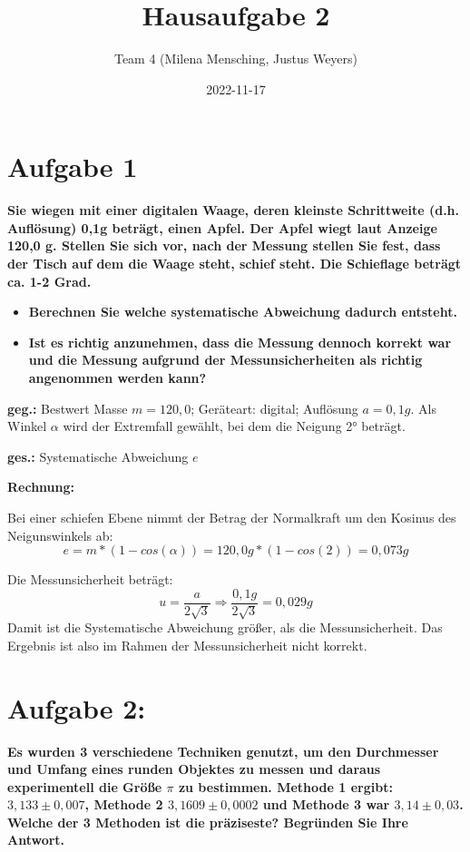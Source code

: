 \documentclass[
]{article}
\title{Hausaufgabe 2}
\author{Team 4 (Milena Mensching, Justus Weyers)}
\date{2022-11-17}
\providecommand{\tightlist}{%
  \setlength{\itemsep}{0pt}\setlength{\parskip}{0pt}}
\begin{document}
\maketitle

\hypertarget{aufgabe-1}{%
\section{Aufgabe 1}\label{aufgabe-1}}

\textbf{Sie wiegen mit einer digitalen Waage, deren kleinste
Schrittweite (d.h. Auflösung) 0,1g beträgt, einen Apfel. Der Apfel wiegt
laut Anzeige 120,0 g. Stellen Sie sich vor, nach der Messung stellen Sie
fest, dass der Tisch auf dem die Waage steht, schief steht. Die
Schieflage beträgt ca. 1-2 Grad.}

\begin{itemize}
\tightlist
\item
  \textbf{Berechnen Sie welche systematische Abweichung dadurch
  entsteht.}
\item
  \textbf{Ist es richtig anzunehmen, dass die Messung dennoch korrekt
  war und die Messung aufgrund der Messunsicherheiten als richtig
  angenommen werden kann?}
\end{itemize}

\textbf{geg.:} Bestwert Masse \(m = 120,0\); Geräteart: digital;
Auflösung \(a=0,1g\). Als Winkel \(\alpha\) wird der Extremfall gewählt,
bei dem die Neigung 2° beträgt.

\textbf{ges.:} Systematische Abweichung \(e\)

\textbf{Rechnung:}

Bei einer schiefen Ebene nimmt der Betrag der Normalkraft um den Kosinus
des Neigunswinkels ab:
\[e = m*(1-cos(\alpha)) = 120,0g*(1-cos(2)) = 0,073g\]

Die Messunsicherheit beträgt:
\[ u = \frac{a}{2\sqrt{3}} \Rightarrow \frac{0,1g}{2\sqrt{3}} = 0,029g\]
Damit ist die Systematische Abweichung größer, als die Messunsicherheit.
Das Ergebnis ist also im Rahmen der Messunsicherheit nicht korrekt.

\hypertarget{aufgabe-2}{%
\section{Aufgabe 2:}\label{aufgabe-2}}

\textbf{Es wurden 3 verschiedene Techniken genutzt, um den Durchmesser
und Umfang eines runden Objektes zu messen und daraus experimentell die
Größe \(\pi\) zu bestimmen. Methode 1 ergibt: \(3,133 \pm 0,007\),
Methode 2 \(3,1609 \pm 0,0002\) und Methode 3 war \(3,14 \pm 0,03\).
Welche der 3 Methoden ist die präziseste? Begründen Sie Ihre Antwort.}
\end{document}
